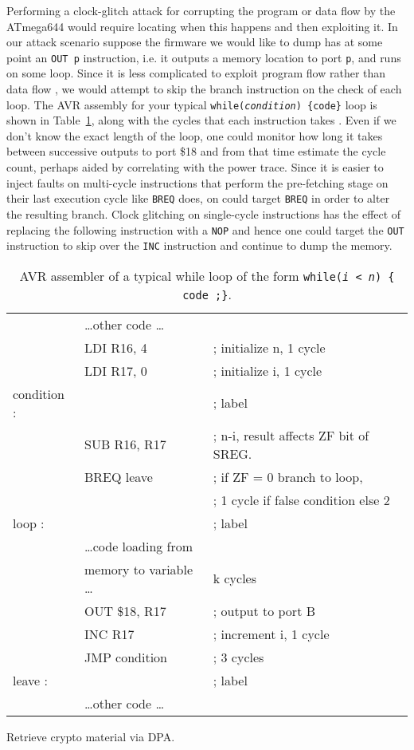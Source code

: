 Performing a clock-glitch attack for corrupting the program or data flow by the ATmega644 would require locating when this happens and then exploiting it. In our attack scenario suppose the firmware we would like to dump has at some point an \texttt{OUT p} instruction, i.e. it outputs a memory location to port \texttt{p}, and runs on some loop. Since it is less complicated to exploit program flow rather than data flow \citep{glitches_paper}, we would attempt to skip the branch instruction on the check of each loop. The AVR assembly for your typical  \texttt{while(\emph{condition}) \{code\}} loop is shown in Table~\ref{tab:while}, along with the cycles that each instruction takes \citep{atmega_manual}. Even if we don't know the exact length of the loop, one could monitor how long it takes between successive outputs to port \$18 and from that time estimate the cycle count, perhaps aided by correlating with the power trace. Since it is easier to inject faults on multi-cycle instructions that perform the pre-fetching stage on their last execution cycle \citep{glitches_paper} like \texttt{BREQ} does, on could target \texttt{BREQ} in order to alter the resulting branch. Clock glitching on single-cycle instructions has the effect of replacing the following instruction with a \texttt{NOP} \citep{glitches_paper} and hence one could target the \texttt{OUT} instruction to skip over the \texttt{INC} instruction and continue to dump the memory. 

\begin{table}
\caption{\footnotesize AVR assembler of  a typical while loop of the form \texttt{while(\emph{i < n}) \{ code ;\}}.}
\label{tab:while}
\center
\begin{tabular}{ l l l }
& \dots other code \dots & \\
&LDI R16, 4 & ; initialize n, 1 cycle\\
&LDI R17, 0 & ; initialize i, 1 cycle \\
condition : &&  ; label\\
& SUB R16, R17 & ; n-i, result affects ZF bit of SREG.\\
& BREQ leave & ; if ZF = 0 branch to loop,\\
& &  ; 1 cycle if false condition else 2\\
loop :  & & ; label\\
& \dots code loading from  &\\
& memory to variable \dots & k cycles\\
& OUT \$18, R17 & ; output to port B\\
& INC R17 & ; increment i, 1 cycle \\
& JMP condition & ; 3 cycles \\
leave : && ; label \\
& \dots other code \dots & \\
\end{tabular}
\end{table}

Retrieve crypto material via DPA.

